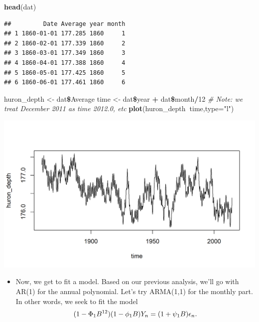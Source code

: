 \documentclass[]{article}
\newenvironment{Shaded}{\begin{snugshade}}{\end{snugshade}}
\newcommand{\KeywordTok}[1]{\textcolor[rgb]{0.13,0.29,0.53}{\textbf{#1}}}
\newcommand{\DataTypeTok}[1]{\textcolor[rgb]{0.13,0.29,0.53}{#1}}
\newcommand{\DecValTok}[1]{\textcolor[rgb]{0.00,0.00,0.81}{#1}}
\newcommand{\StringTok}[1]{\textcolor[rgb]{0.31,0.60,0.02}{#1}}
\newcommand{\CommentTok}[1]{\textcolor[rgb]{0.56,0.35,0.01}{\textit{#1}}}
\newcommand{\OperatorTok}[1]{\textcolor[rgb]{0.81,0.36,0.00}{\textbf{#1}}}
\newcommand{\NormalTok}[1]{#1}
\providecommand{\tightlist}{%
  \setlength{\itemsep}{0pt}\setlength{\parskip}{0pt}}
\begin{document}
\begin{Shaded}
\begin{Highlighting}[]
\KeywordTok{head}\NormalTok{(dat)}
\end{Highlighting}
\end{Shaded}

\begin{verbatim}
##         Date Average year month
## 1 1860-01-01 177.285 1860     1
## 2 1860-02-01 177.339 1860     2
## 3 1860-03-01 177.349 1860     3
## 4 1860-04-01 177.388 1860     4
## 5 1860-05-01 177.425 1860     5
## 6 1860-06-01 177.461 1860     6
\end{verbatim}

\begin{Shaded}
\begin{Highlighting}[]
\NormalTok{huron_depth <-}\StringTok{ }\NormalTok{dat}\OperatorTok{\$}\NormalTok{Average}
\NormalTok{time <-}\StringTok{ }\NormalTok{dat}\OperatorTok{\$}\NormalTok{year }\OperatorTok{+}\StringTok{ }\NormalTok{dat}\OperatorTok{\$}\NormalTok{month}\OperatorTok{/}\DecValTok{12} \CommentTok{# Note: we treat December 2011 as time 2012.0, etc}
\KeywordTok{plot}\NormalTok{(huron_depth}\OperatorTok{~}\NormalTok{time,}\DataTypeTok{type=}\StringTok{"l"}\NormalTok{)}
\end{Highlighting}
\end{Shaded}

\begin{center}\includegraphics{figure/intro-plot_data-1} \end{center}

\begin{itemize}
\tightlist
\item
  Now, we get to fit a model. Based on our previous analysis, we'll go
  with AR(1) for the annual polynomial. Let's try ARMA(1,1) for the
  monthly part. In other words, we seek to fit the model
  \[ (1-\Phi_1 B^{12})(1-\phi_1 B) Y_n = (1+\psi_1 B)\epsilon_n.\]
\end{itemize}
\end{document}
